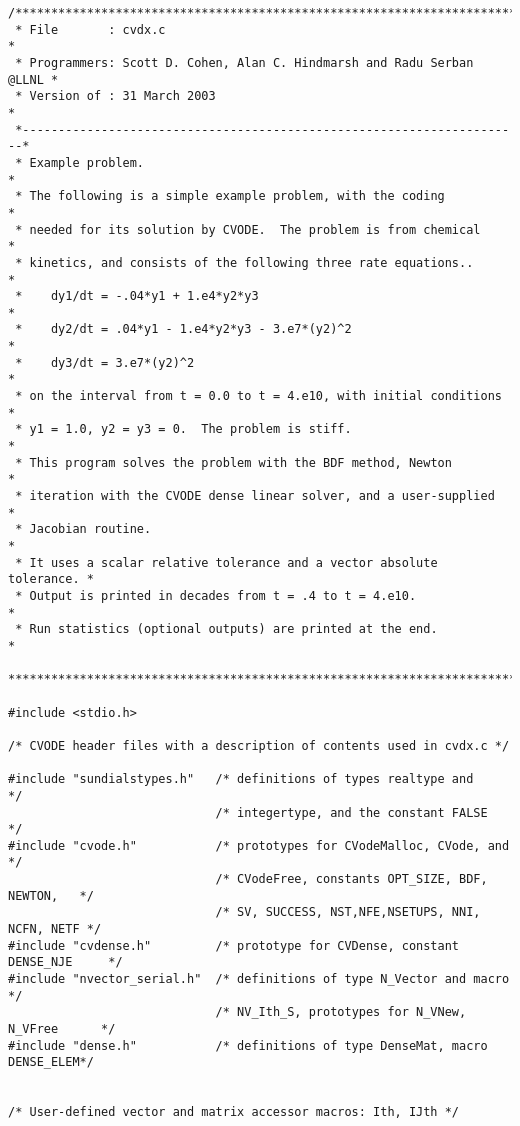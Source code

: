 \begin{verbatim}
/************************************************************************
 * File       : cvdx.c                                                  *
 * Programmers: Scott D. Cohen, Alan C. Hindmarsh and Radu Serban @LLNL *
 * Version of : 31 March 2003                                           *
 *----------------------------------------------------------------------*
 * Example problem.                                                     *
 * The following is a simple example problem, with the coding           *
 * needed for its solution by CVODE.  The problem is from chemical      *
 * kinetics, and consists of the following three rate equations..       *
 *    dy1/dt = -.04*y1 + 1.e4*y2*y3                                     *
 *    dy2/dt = .04*y1 - 1.e4*y2*y3 - 3.e7*(y2)^2                        *
 *    dy3/dt = 3.e7*(y2)^2                                              *
 * on the interval from t = 0.0 to t = 4.e10, with initial conditions   *
 * y1 = 1.0, y2 = y3 = 0.  The problem is stiff.                        *
 * This program solves the problem with the BDF method, Newton          *
 * iteration with the CVODE dense linear solver, and a user-supplied    *
 * Jacobian routine.                                                    * 
 * It uses a scalar relative tolerance and a vector absolute tolerance. *
 * Output is printed in decades from t = .4 to t = 4.e10.               *
 * Run statistics (optional outputs) are printed at the end.            *
 ************************************************************************/

#include <stdio.h>

/* CVODE header files with a description of contents used in cvdx.c */

#include "sundialstypes.h"   /* definitions of types realtype and             */
                             /* integertype, and the constant FALSE           */
#include "cvode.h"           /* prototypes for CVodeMalloc, CVode, and        */
                             /* CVodeFree, constants OPT_SIZE, BDF, NEWTON,   */
                             /* SV, SUCCESS, NST,NFE,NSETUPS, NNI, NCFN, NETF */
#include "cvdense.h"         /* prototype for CVDense, constant DENSE_NJE     */
#include "nvector_serial.h"  /* definitions of type N_Vector and macro        */
                             /* NV_Ith_S, prototypes for N_VNew, N_VFree      */
#include "dense.h"           /* definitions of type DenseMat, macro DENSE_ELEM*/


/* User-defined vector and matrix accessor macros: Ith, IJth */


\end{verbatim}
